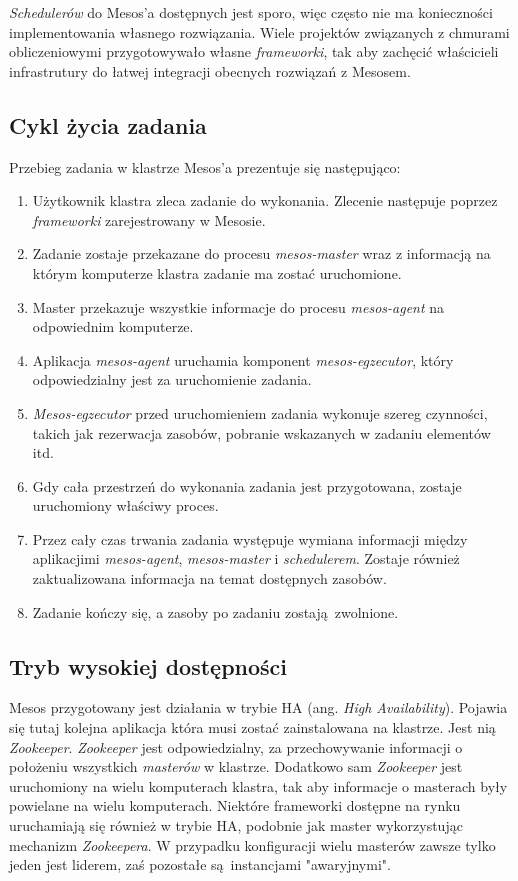 \documentclass[10pt,a4paper,titlepage,twoside]{report}
\begin{document}
\textit{Schedulerów} do Mesos'a dostępnych jest sporo, więc często nie ma konieczności implementowania własnego rozwiązania. Wiele projektów związanych z chmurami obliczeniowymi przygotowywało własne \textit{frameworki}, tak aby zachęcić właścicieli infrastrutury do łatwej integracji obecnych rozwiązań z Mesosem.

\subsection{Cykl życia zadania}

Przebieg zadania w klastrze Mesos'a prezentuje się następująco:
\begin{enumerate}
\item Użytkownik klastra zleca zadanie do wykonania. Zlecenie następuje poprzez \textit{frameworki} zarejestrowany w Mesosie. 
\item Zadanie zostaje przekazane do procesu \textit{mesos-master} wraz z informacją na którym komputerze klastra zadanie ma zostać uruchomione.
\item Master przekazuje wszystkie informacje do procesu \textit{mesos-agent} na odpowiednim komputerze.
\item Aplikacja \textit{mesos-agent} uruchamia komponent \textit{mesos-egzecutor}, który odpowiedzialny jest za uruchomienie zadania. 
\item \textit{Mesos-egzecutor} przed uruchomieniem zadania wykonuje szereg czynności, takich jak rezerwacja zasobów, pobranie wskazanych w zadaniu elementów itd.
\item Gdy cała przestrzeń do wykonania zadania jest przygotowana, zostaje uruchomiony właściwy proces. 
\item Przez cały czas trwania zadania występuje wymiana informacji między aplikacjimi \textit{mesos-agent}, \textit{mesos-master} i \textit{schedulerem}. Zostaje również zaktualizowana informacja na temat dostępnych zasobów.
\item Zadanie kończy się, a zasoby po zadaniu zostają zwolnione.
\end{enumerate}

\subsection{Tryb wysokiej dostępności}
Mesos przygotowany jest działania w trybie HA (ang. \textit{High Availability}). Pojawia się tutaj kolejna aplikacja która musi zostać zainstalowana na klastrze. Jest nią \textit{Zookeeper}. \textit{Zookeeper} jest odpowiedzialny, za przechowywanie informacji o położeniu wszystkich \textit{masterów} w klastrze. Dodatkowo sam \textit{Zookeeper} jest uruchomiony na wielu komputerach klastra, tak aby informacje o masterach były powielane na wielu komputerach. Niektóre frameworki dostępne na rynku uruchamiają się również w trybie HA, podobnie jak master wykorzystując mechanizm \textit{Zookeepera}. W przypadku konfiguracji wielu masterów zawsze tylko jeden jest liderem, zaś pozostałe są instancjami "awaryjnymi". 
\end{document}
